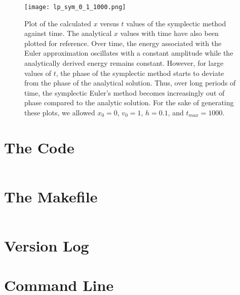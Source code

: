 \documentclass{article}
\begin{document}
\begin{figure}
    \centering
    \texttt{[image: lp\_sym\_0\_1\_1000.png]}{}
    \caption{Plot of the calculated $x$ versus $t$ values of the symplectic method against time.  The analytical $x$ values with time have also been plotted for reference. Over time, the energy associated with the Euler approximation oscillates with a constant amplitude while the analytically derived energy remains constant.  However, for large values of $t$, the phase of the symplectic method starts to deviate from the phase of the analytical solution.  Thus, over long periods of time, the symplectic Euler's method becomes increasingly out of phase compared to the analytic solution.  For the sake of generating these plots, we allowed $x_0 = 0$, $v_0 = 1$, $h = 0.1$, and $t_{max} = 1000$.}
    \label{fig:phase_err}
\end{figure}

\newpage
\section{The Code}
\inputminted{octave}{ph_20_3_code.py}

\newpage
\section{The Makefile}
\inputminted{octave}{Makefile}

\newpage
\section{Version Log}


\newpage
\section{Command Line}

\end{document}
